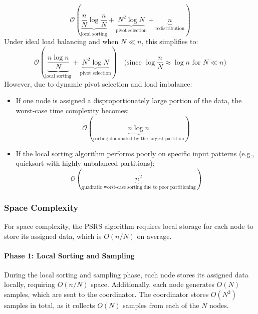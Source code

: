 \documentclass[]{interact}
\theoremstyle{plain}
\theoremstyle{definition}
\theoremstyle{remark}
\begin{document}
\begin{equation}
    \mathcal{O}\left( \underbrace{\frac{n}{N} \log \frac{n}{N}}_{\text{local sorting}} + \underbrace{N^2 \log N}_{\text{pivot selection}} + \underbrace{n}_{\text{redistribution}} \right)
\end{equation}
Under ideal load balancing and when \(N \ll n\), this simplifies to:
\begin{equation}
    \mathcal{O}\left( \underbrace{\frac{n \log n}{N}}_{\text{local sorting}} + \underbrace{N^2 \log N}_{\text{pivot selection}} \right) \quad \text{(since \(\log \frac{n}{N} \approx \log n\) for \(N \ll n\))}
\end{equation}
However, due to dynamic pivot selection and load imbalance:
\begin{itemize}
     \item If one node is assigned a disproportionately large portion of the data, the worst-case time complexity becomes:
        \begin{equation}
            \mathcal{O}\left( \underbrace{n \log n}_{\text{sorting dominated by the largest partition}} \right)
        \end{equation}
        \item If the local sorting algorithm performs poorly on specific input patterns (e.g., quicksort with highly unbalanced partitions):
        \begin{equation}
            \mathcal{O}\left( \underbrace{n^2}_{\text{quadratic worst-case sorting due to poor partitioning}} \right)
        \end{equation}
\end{itemize}

\subsubsection{Space Complexity}
For space complexity, the PSRS algorithm requires local storage for each node to store its assigned data, which is $O(n/N)$ on average. 

\paragraph{Phase 1: Local Sorting and Sampling} 
During the local sorting and sampling phase, each node stores its assigned data locally, requiring $O(n/N)$ space. Additionally, each node generates $O(N)$ samples, which are sent to the coordinator. The coordinator stores $O(N^2)$ samples in total, as it collects $O(N)$ samples from each of the $N$ nodes.
\end{document}
